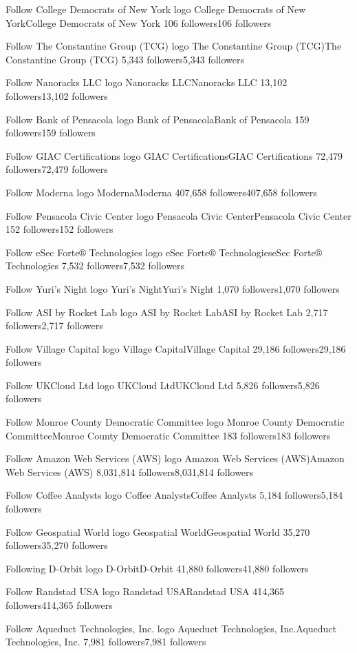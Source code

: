 Follow
College Democrats of New York logo
College Democrats of New YorkCollege Democrats of New York
106 followers106 followers

Follow
The Constantine Group (TCG) logo
The Constantine Group (TCG)The Constantine Group (TCG)
5,343 followers5,343 followers

Follow
Nanoracks LLC logo
Nanoracks LLCNanoracks LLC
13,102 followers13,102 followers

Follow
Bank of Pensacola logo
Bank of PensacolaBank of Pensacola
159 followers159 followers

Follow
GIAC Certifications logo
GIAC CertificationsGIAC Certifications
72,479 followers72,479 followers

Follow
Moderna logo
ModernaModerna
407,658 followers407,658 followers

Follow
Pensacola Civic Center logo
Pensacola Civic CenterPensacola Civic Center
152 followers152 followers

Follow
eSec Forte® Technologies logo
eSec Forte® TechnologieseSec Forte® Technologies
7,532 followers7,532 followers

Follow
Yuri's Night logo
Yuri's NightYuri's Night
1,070 followers1,070 followers

Follow
ASI by Rocket Lab logo
ASI by Rocket LabASI by Rocket Lab
2,717 followers2,717 followers

Follow
Village Capital logo
Village CapitalVillage Capital
29,186 followers29,186 followers

Follow
UKCloud Ltd logo
UKCloud LtdUKCloud Ltd
5,826 followers5,826 followers

Follow
Monroe County Democratic Committee logo
Monroe County Democratic CommitteeMonroe County Democratic Committee
183 followers183 followers

Follow
Amazon Web Services (AWS) logo
Amazon Web Services (AWS)Amazon Web Services (AWS)
8,031,814 followers8,031,814 followers

Follow
Coffee Analysts logo
Coffee AnalystsCoffee Analysts
5,184 followers5,184 followers

Follow
Geospatial World logo
Geospatial WorldGeospatial World
35,270 followers35,270 followers

Following
D-Orbit logo
D-OrbitD-Orbit
41,880 followers41,880 followers

Follow
Randstad USA logo
Randstad USARandstad USA
414,365 followers414,365 followers

Follow
Aqueduct Technologies, Inc. logo
Aqueduct Technologies, Inc.Aqueduct Technologies, Inc.
7,981 followers7,981 followers

